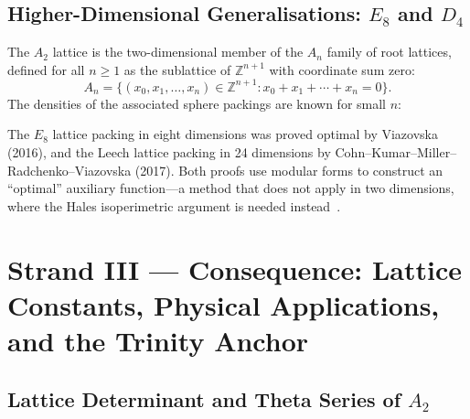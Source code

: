 \subsection{Higher-Dimensional Generalisations: \(E_8\) and \(D_4\)}
\label{subsec:fol-higher-dim}

The \(A_2\) lattice is the two-dimensional member of the \(A_n\) family
of root lattices, defined for all \(n\ge 1\) as the sublattice of
\(\mathbb{Z}^{n+1}\) with coordinate sum zero:
\[
  A_n = \{(x_0,x_1,\ldots,x_n)\in\mathbb{Z}^{n+1}:
           x_0+x_1+\cdots+x_n=0\}.
\]
The densities of the associated sphere packings are known for small \(n\):
\begin{center}
\end{center}
The \(E_8\) lattice packing in eight dimensions was proved optimal by
Viazovska (2016), and the Leech lattice packing in 24 dimensions by
Cohn--Kumar--Miller--Radchenko--Viazovska (2017).  Both proofs use
modular forms to construct an ``optimal'' auxiliary function—a method
that does not apply in two dimensions, where the Hales isoperimetric
argument is needed instead~\cite{conway_sphere_packings}.

\section{Strand III — Consequence: Lattice Constants, Physical
         Applications, and the Trinity Anchor}
\label{sec:fol-strand3}

\subsection{Lattice Determinant and Theta Series of \(A_2\)}
\label{subsec:fol-theta}

